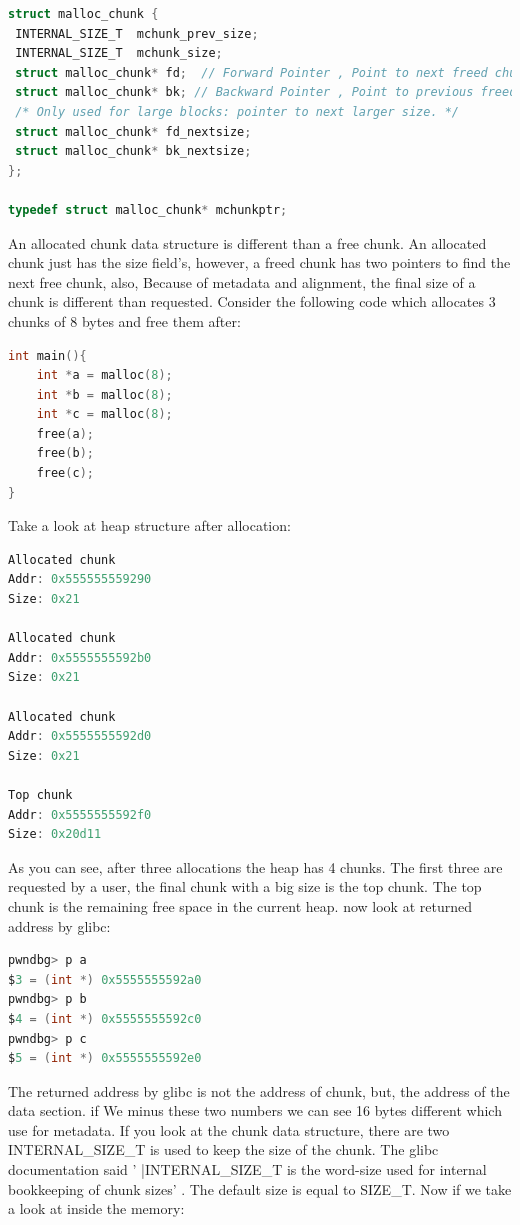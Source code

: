 \documentclass{masterthesis}
\newcommand*\sizet{SIZE\_T}
\newcommand*\libc{glibc}
\begin{document}
\begin{lstlisting}[language=c,frame=tlrb]
struct malloc_chunk {
 INTERNAL_SIZE_T  mchunk_prev_size; 
 INTERNAL_SIZE_T  mchunk_size;
 struct malloc_chunk* fd;  // Forward Pointer , Point to next freed chunk
 struct malloc_chunk* bk; // Backward Pointer , Point to previous freed chunk in double link list
 /* Only used for large blocks: pointer to next larger size. */
 struct malloc_chunk* fd_nextsize;
 struct malloc_chunk* bk_nextsize;
};

typedef struct malloc_chunk* mchunkptr;
\end{lstlisting}

An allocated chunk data structure is different than a free chunk. An allocated chunk just has the size field's, however, a freed chunk has two pointers to find the next free chunk, also, Because of metadata and alignment, the final size of a chunk is different than requested. Consider the following code which allocates 3 chunks of 8 bytes and free them after:

\begin{lstlisting}[language=c,frame=tlrb]
int main(){
	int *a = malloc(8);
	int *b = malloc(8);
	int *c = malloc(8);
	free(a);
	free(b);
	free(c);
}
\end{lstlisting}

Take a look at heap structure after allocation: 

\begin{lstlisting}[language=c,frame=tlrb]
Allocated chunk
Addr: 0x555555559290
Size: 0x21

Allocated chunk
Addr: 0x5555555592b0
Size: 0x21

Allocated chunk
Addr: 0x5555555592d0
Size: 0x21

Top chunk 
Addr: 0x5555555592f0
Size: 0x20d11
\end{lstlisting}

As you can see, after three allocations the heap has 4 chunks. The first three are requested by a user, the final chunk with a big size is the top chunk. The top chunk is the remaining free space in the current heap. now look at returned address by \libc{}:

\begin{lstlisting}[language=c,frame=tlrb]
pwndbg> p a
$3 = (int *) 0x5555555592a0
pwndbg> p b
$4 = (int *) 0x5555555592c0
pwndbg> p c
$5 = (int *) 0x5555555592e0
\end{lstlisting}

The returned address by \libc{} is not the address of chunk, but, the address of the data section. if We minus these two numbers we can see 16 bytes different which use for metadata. If you look at the chunk data structure, there are two INTERNAL\_SIZE\_T is used to keep the size of the chunk. The \libc{} documentation said ' |INTERNAL\_SIZE\_T is the word-size used for internal bookkeeping of chunk sizes' . The default size is equal to \sizet{}. Now if we take a look at inside the memory: 
\end{document}
